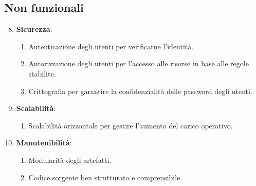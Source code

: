 %
%
%
\subsection{Non funzionali}

\begin{enumerate}
    \setcounter{enumi}{7}

    \item \textbf{Sicurezza}:
    \begin{enumerate}[label*=\arabic*.]
        \item Autenticazione degli utenti per verificarne l'identità.

        \item Autorizzazione degli utenti per l'accesso alle risorse in base alle regole stabilite.

        \item Crittografia per garantire la confidenzialità delle password degli utenti.
    \end{enumerate}
    
    \item \textbf{Scalabilità}:
    \begin{enumerate}[label*=\arabic*.]
        \item Scalabilità orizzontale per gestire l'aumento del carico operativo.
    \end{enumerate}

    \item \textbf{Manutenibilità}:
    \begin{enumerate}[label*=\arabic*.]
        \item Modularità degli artefatti.
        \item Codice sorgente ben strutturato e comprensibile.
    \end{enumerate}

\end{enumerate}